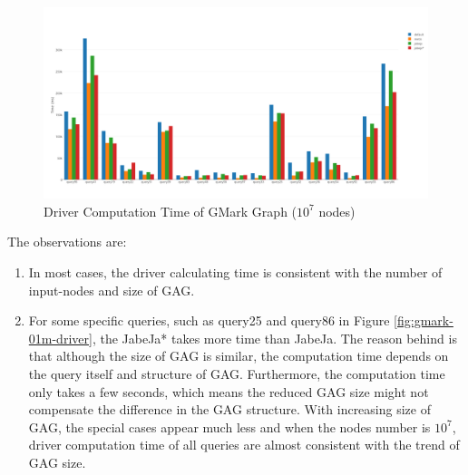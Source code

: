 \begin{figure}[h!]
  \caption{Driver Computation Time of GMark Graph ($10^7$ nodes)}
  \label{fig:gmark-10m-driver}
  \centering
    \includegraphics[width=1.0\textwidth]{img/gmark-10m-driver}
\end{figure}
The observations are:
\begin{enumerate}
    \item In most cases, the driver calculating time is consistent with the number of input-nodes and size of GAG.
    \item For some specific queries, such as query25 and query86 in Figure \ref{fig:gmark-01m-driver}, the JabeJa* takes more time than JabeJa. The reason behind is that although the size of GAG is similar, the computation time depends on the query itself and structure of GAG. Furthermore, the computation time only takes a few seconds, which means the reduced GAG size might not compensate the difference in the GAG structure. With increasing size of GAG, the special cases appear much less and when the nodes number is $10^7$, driver computation time of all queries are almost consistent with the trend of GAG size.
\end{enumerate}
